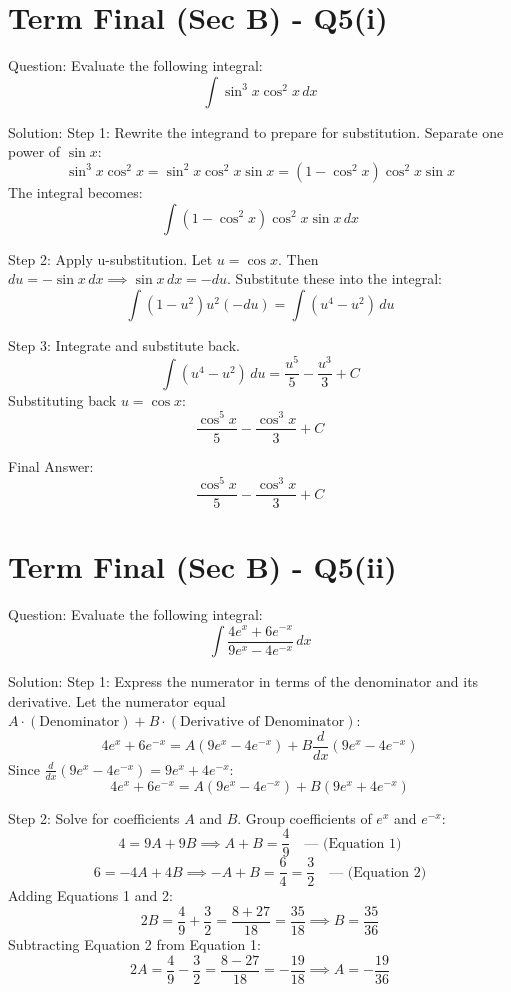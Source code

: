 \documentclass{article}
\begin{document}
\section*{Term Final (Sec B) - Q5(i)}
Question:
Evaluate the following integral:
\[
\int \sin^3 x \cos^2 x \, dx
\]

Solution:
Step 1: Rewrite the integrand to prepare for substitution.
Separate one power of $\sin x$:
\[
\sin^3 x \cos^2 x = \sin^2 x \cos^2 x \sin x = (1 - \cos^2 x) \cos^2 x \sin x
\]
The integral becomes:
\[
\int (1 - \cos^2 x) \cos^2 x \sin x \, dx
\]

Step 2: Apply u-substitution.
Let $u = \cos x$. Then $du = -\sin x \, dx \implies \sin x \, dx = -du$.
Substitute these into the integral:
\[
\int (1 - u^2) u^2 (-du) = \int (u^4 - u^2) \, du
\]

Step 3: Integrate and substitute back.
\[
\int (u^4 - u^2) \, du = \frac{u^5}{5} - \frac{u^3}{3} + C
\]
Substituting back $u = \cos x$:
\[
\frac{\cos^5 x}{5} - \frac{\cos^3 x}{3} + C
\]

Final Answer:
\[
\boxed{\frac{\cos^5 x}{5} - \frac{\cos^3 x}{3} + C}
\]

\section*{Term Final (Sec B) - Q5(ii)}
Question:
Evaluate the following integral:
\[
\int \frac{4e^x + 6e^{-x}}{9e^x - 4e^{-x}} \, dx
\]

Solution:
Step 1: Express the numerator in terms of the denominator and its derivative.
Let the numerator equal $A \cdot (\text{Denominator}) + B \cdot (\text{Derivative of Denominator})$:
\[
4e^x + 6e^{-x} = A(9e^x - 4e^{-x}) + B \frac{d}{dx}(9e^x - 4e^{-x})
\]
Since $\frac{d}{dx}(9e^x - 4e^{-x}) = 9e^x + 4e^{-x}$:
\[
4e^x + 6e^{-x} = A(9e^x - 4e^{-x}) + B(9e^x + 4e^{-x})
\]

Step 2: Solve for coefficients $A$ and $B$.
Group coefficients of $e^x$ and $e^{-x}$:
\[
4 = 9A + 9B \implies A + B = \frac{4}{9} \quad \text{--- (Equation 1)}
\]
\[
6 = -4A + 4B \implies -A + B = \frac{6}{4} = \frac{3}{2} \quad \text{--- (Equation 2)}
\]
Adding Equations 1 and 2:
\[
2B = \frac{4}{9} + \frac{3}{2} = \frac{8 + 27}{18} = \frac{35}{18} \implies B = \frac{35}{36}
\]
Subtracting Equation 2 from Equation 1:
\[
2A = \frac{4}{9} - \frac{3}{2} = \frac{8 - 27}{18} = -\frac{19}{18} \implies A = -\frac{19}{36}
\]
\end{document}
